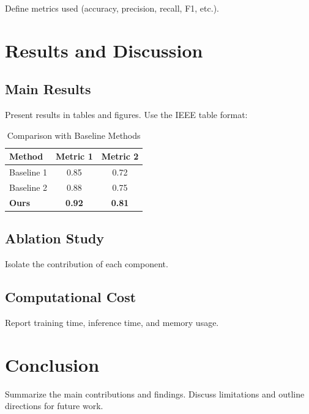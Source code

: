 \documentclass[journal]{IEEEtran}
\begin{document}
Define metrics used (accuracy, precision, recall, F1, etc.).

\section{Results and Discussion}

\subsection{Main Results}

Present results in tables and figures. Use the IEEE table format:

\begin{table}[t]
  \centering
  \caption{Comparison with Baseline Methods}
  \label{tab:results}
  \begin{tabular}{lcc}
    \toprule
    Method & Metric 1 & Metric 2 \\
    \midrule
    Baseline 1 & 0.85 & 0.72 \\
    Baseline 2 & 0.88 & 0.75 \\
    \textbf{Ours} & \textbf{0.92} & \textbf{0.81} \\
    \bottomrule
  \end{tabular}
\end{table}

\subsection{Ablation Study}

Isolate the contribution of each component.

\subsection{Computational Cost}

Report training time, inference time, and memory usage.

\section{Conclusion}

Summarize the main contributions and findings. Discuss limitations
and outline directions for future work.
\end{document}
